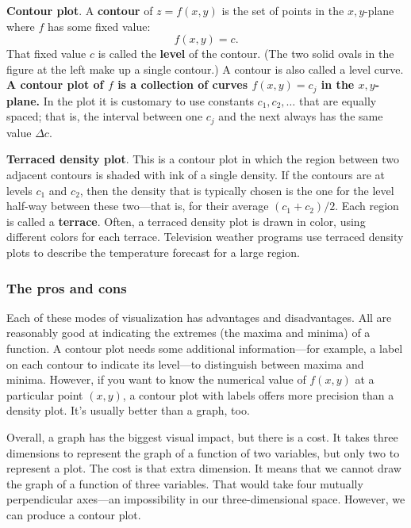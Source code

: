 {{{{{\bf Contour plot}.  A {\bf contour} of $z = f(x, y)$ is the set of points in the $x, y$-plane where $f$ has some fixed value: 
	\[
f(x, y) = c.
\]
That fixed value $c$ is called the {\bf level} of the contour.   (The two solid ovals in the figure at the left make up a single contour.)  A contour is also called a level curve.  {\bf A contour plot of $f$ is a collection of curves $f(x, y) = c_j$ in the $x, y$-plane.}  In the plot it is customary to use constants $c_1, c_2, \ldots$ that are equally spaced; that is, the interval between one $c_j$ and the next always has the same value $\Delta c$.
\medskip


{\bf Terraced density plot}.  This is a contour plot in which the region between two adjacent contours is shaded with ink of a single density.  If the contours are at levels $c_1$ and $c_2$, then the density that is typically chosen is the one for the level half-way between these two---that is, for their average $(c_1 + c_2)/2$.    Each region is called a {\bf terrace}.  Often, a terraced density plot is drawn in color, using different colors for each terrace.  Television weather programs use terraced density plots to describe the temperature forecast for a large region.


\subsubsection{The pros and cons}

	Each of these modes of visualization has advantages and disadvantages.  All are reasonably good at indicating the extremes (the maxima and minima) of a function.  A contour plot needs some additional information---for example, a label on each contour to indicate its level---to distinguish between maxima and minima.  However, if you want to know the numerical value of $f(x, y)$ at a particular point $(x, y)$, a contour plot with labels offers more precision than a density plot.  It's usually better than a graph, too.  

	Overall, a graph has the biggest visual impact, 
but there is a cost.  It takes three dimensions to represent the graph of a function of two variables, but only two to represent a plot.  The cost is that extra dimension.  It means that we cannot draw the graph of a function of three variables.  That would take four mutually perpendicular axes---an impossibility in our three-dimensional space.  However, we can produce a contour plot.  

}}}}
